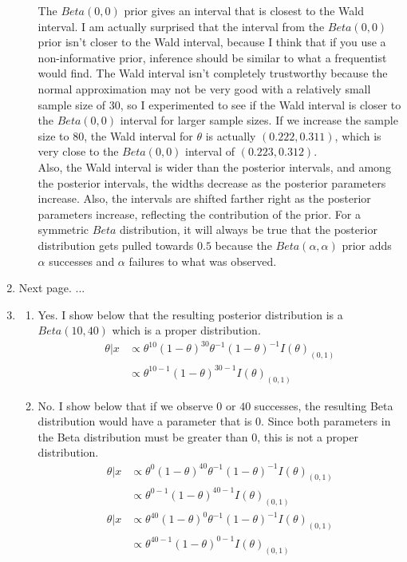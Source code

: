 \documentclass[12pt]{article}\usepackage[]{graphicx}\usepackage[]{color}
\begin{document}
\begin{doublespacing}
\begin{enumerate}
\begin{enumerate}
The $Beta(0, 0)$ prior gives an interval that is closest to the Wald interval. I am actually surprised that the interval from the $Beta(0,0)$ prior isn't closer to the Wald interval, because I think that if you use a non-informative prior, inference should be similar to what a frequentist would find. The Wald interval isn't completely trustworthy because the normal approximation may not be very good with a relatively small sample size of $30$, so I experimented to see if the Wald interval is closer to the $Beta(0,0)$ interval for larger sample sizes. If we increase the sample size to $80$, the Wald interval for $\theta$ is actually $(0.222, 0.311)$, which is very close to the $Beta(0, 0)$ interval of $(0.223, 0.312)$. \\

Also, the Wald interval is wider than the posterior intervals, and among the posterior intervals, the widths decrease as the posterior parameters increase. Also, the intervals are shifted farther right as the posterior parameters increase, reflecting the contribution of the prior. For a symmetric $Beta$ distribution, it will always be true that the posterior distribution gets pulled towards $0.5$ because the $Beta(\alpha, \alpha)$ prior adds $\alpha$ successes and $\alpha$ failures to what was observed.

\end{enumerate}

\item Next page.
\newpage
...
\newpage

\item \begin{enumerate}
\item Yes. I show below that the resulting posterior distribution is a $Beta(10, 40)$ which is a proper distribution.
\begin{align*}
\theta|x &\propto \theta^{10}(1-\theta)^{30}\theta^{-1}(1-\theta)^{-1}I(\theta)_{(0,1)} \\
&\propto \theta^{10-1}(1-\theta)^{30-1}I(\theta)_{(0,1)} 
\end{align*}

\item No. I show below that if we observe $0$ or $40$ successes, the resulting Beta distribution would have a parameter that is $0$. Since both parameters in the Beta distribution must be greater than $0$, this is not a proper distribution. 
\begin{align*}
\theta|x &\propto \theta^{0}(1-\theta)^{40}\theta^{-1}(1-\theta)^{-1}I(\theta)_{(0,1)} \\
&\propto \theta^{0-1}(1-\theta)^{40-1}I(\theta)_{(0,1)} \\
\theta|x &\propto \theta^{40}(1-\theta)^{0}\theta^{-1}(1-\theta)^{-1}I(\theta)_{(0,1)} \\
&\propto \theta^{40-1}(1-\theta)^{0-1}I(\theta)_{(0,1)} 
\end{align*}


\end{enumerate}
\end{enumerate}
\end{doublespacing}
\end{document}
